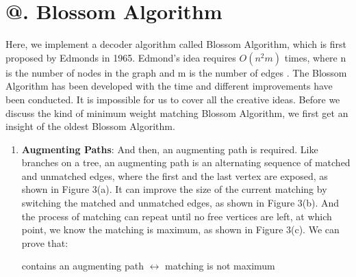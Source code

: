 \documentclass[
    a4paper, %
    10pt, %
    unnumberedsections, %
    twoside, %
]{LTJournalArticle}
\makeatletter
\newcommand{\Rmnum}[1]{\expandafter\@slowromancap\romannumeral #1@}
\makeatother
\begin{document}
\section{\Rmnum{3}. Blossom Algorithm}
    Here, we implement a decoder algorithm called Blossom Algorithm, which is first proposed by Edmonds in 1965. Edmond's idea requires $O(n^2m)$ times, where n is the number of nodes in the graph and m is the number of edges \cite{10}. The Blossom Algorithm has been developed with the time and different improvements have been conducted. It is impossible for us to cover all the creative ideas. Before we discuss the kind of minimum weight matching Blossom Algorithm, we first get an insight of the oldest Blossom Algorithm.
\begin{enumerate}
    \item \textbf{Augmenting Paths}: And then, an augmenting path is required. Like branches on a tree, an augmenting path is an alternating sequence of matched and unmatched edges, where the first and the last vertex are exposed, as shown in Figure 3(a). It can improve the size of the current matching by switching the matched and unmatched edges, as shown in Figure 3(b). And the process of matching can repeat until no free vertices are left, at which point, we know the matching is maximum, as shown in Figure 3(c). We can prove that: 
    \begin{center}
        contains an augmenting path $\leftrightarrow $ matching is not maximum
    \end{center}
    \begin{figure}[htbp] %
    \centering %
    \vspace{0cm} %
    \setlength{\abovecaptionskip}{0.cm} %

\end{figure}
\end{enumerate}
\end{document}
